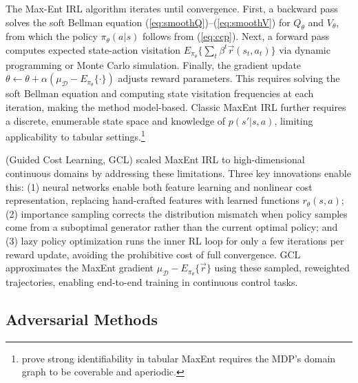 The Max-Ent IRL algorithm \citep{ziebart:2010} iterates until convergence. First, a backward pass solves the soft Bellman equation (\ref{eq:smoothQ})--(\ref{eq:smoothV}) for $Q_\theta$ and $V_\theta$, from which the policy $\pi_\theta(a|s)$ follows from (\ref{eq:ccp}). Next, a forward pass computes expected state-action visitation $E_{\pi_\theta}\{\sum_t \beta^t \vec{r}(s_t,a_t)\}$ via dynamic programming or Monte Carlo simulation. Finally, the gradient update $\theta \leftarrow \theta + \alpha(\mu_{\mathcal{D}} - E_{\pi_\theta}\{\cdot\})$ adjusts reward parameters. This requires solving the soft Bellman equation and computing state visitation frequencies at each iteration, making the method model-based. Classic MaxEnt IRL further requires a discrete, enumerable state space and knowledge of $p(s'|s,a)$, limiting applicability to tabular settings.\footnote{\footnotesize \citet{kim:2021} prove strong identifiability in tabular MaxEnt requires the MDP's domain graph to be coverable and aperiodic.}

\citet{guidedcostlearning:2016} (Guided Cost Learning, GCL) scaled MaxEnt IRL to high-dimensional continuous domains by addressing these limitations. Three key innovations enable this: (1) neural networks enable both feature learning and nonlinear cost representation, replacing hand-crafted features with learned functions $r_\theta(s,a)$; (2) importance sampling corrects the distribution mismatch when policy samples come from a suboptimal generator rather than the current optimal policy; and (3) lazy policy optimization runs the inner RL loop for only a few iterations per reward update, avoiding the prohibitive cost of full convergence. GCL approximates the MaxEnt gradient $\mu_{\mathcal{D}} - E_{\pi_\theta}\{\vec{r}\}$ using these sampled, reweighted trajectories, enabling end-to-end training in continuous control tasks.

\subsection{Adversarial Methods}

